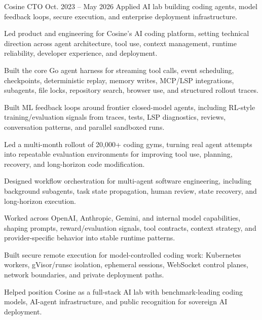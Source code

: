 
\ResumeJob
  {Cosine}
  {CTO}
  {Oct. 2023 -- May 2026}
  {Applied AI lab building coding agents, model feedback loops, secure execution, and enterprise deployment infrastructure.}
\begin{ResumeList}
  \item Led product and engineering for Cosine's AI coding platform, setting technical direction across agent architecture, tool use, context management, runtime reliability, developer experience, and deployment.
  \item Built the core Go agent harness for streaming tool calls, event scheduling, checkpoints, deterministic replay, memory writes, MCP/LSP integrations, subagents, file locks, repository search, browser use, and structured rollout traces.
  \item Built ML feedback loops around frontier closed-model agents, including RL-style training/evaluation signals from traces, tests, LSP diagnostics, reviews, conversation patterns, and parallel sandboxed runs.
  \item Led a multi-month rollout of 20,000+ coding gyms, turning real agent attempts into repeatable evaluation environments for improving tool use, planning, recovery, and long-horizon code modification.
  \item Designed workflow orchestration for multi-agent software engineering, including background subagents, task state propagation, human review, state recovery, and long-horizon execution.
  \item Worked across OpenAI, Anthropic, Gemini, and internal model capabilities, shaping prompts, reward/evaluation signals, tool contracts, context strategy, and provider-specific behavior into stable runtime patterns.
  \item Built secure remote execution for model-controlled coding work: Kubernetes workers, gVisor/runsc isolation, ephemeral sessions, WebSocket control planes, network boundaries, and private deployment paths.
  \item Helped position Cosine as a full-stack AI lab with benchmark-leading coding models, AI-agent infrastructure, and public recognition for sovereign AI deployment.
\end{ResumeList}

